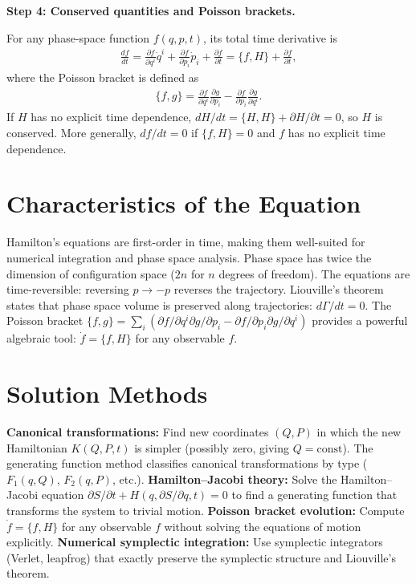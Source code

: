 \textbf{Step 4: Conserved quantities and Poisson brackets.}

For any phase-space function $f(q, p, t)$, its total time derivative is
\begin{align}
\frac{df}{dt} = \frac{\partial f}{\partial q^i}\dot{q}^i + \frac{\partial f}{\partial p_i}\dot{p}_i + \frac{\partial f}{\partial t} = \{f, H\} + \frac{\partial f}{\partial t},
\end{align}
where the Poisson bracket is defined as
\begin{align}
\{f, g\} = \frac{\partial f}{\partial q^i}\frac{\partial g}{\partial p_i} - \frac{\partial f}{\partial p_i}\frac{\partial g}{\partial q^i}.
\end{align}
If $H$ has no explicit time dependence, $dH/dt = \{H, H\} + \partial H/\partial t = 0$, so $H$ is conserved. More generally, $df/dt = 0$ if $\{f, H\} = 0$ and $f$ has no explicit time dependence.

\section*{Characteristics of the Equation}

Hamilton's equations are first-order in time, making them well-suited for numerical integration and phase space analysis. Phase space has twice the dimension of configuration space ($2n$ for $n$ degrees of freedom). The equations are time-reversible: reversing $p \to -p$ reverses the trajectory. Liouville's theorem states that phase space volume is preserved along trajectories: $d\Gamma/dt = 0$. The Poisson bracket $\{f, g\} = \sum_i(\partial f/\partial q^i \partial g/\partial p_i - \partial f/\partial p_i \partial g/\partial q^i)$ provides a powerful algebraic tool: $\dot{f} = \{f, H\}$ for any observable $f$.
\section*{Solution Methods}

\textbf{Canonical transformations:} Find new coordinates $(Q, P)$ in which the new Hamiltonian $K(Q, P, t)$ is simpler (possibly zero, giving $Q = \text{const}$). The generating function method classifies canonical transformations by type ($F_1(q,Q)$, $F_2(q,P)$, etc.). \textbf{Hamilton--Jacobi theory:} Solve the Hamilton--Jacobi equation $\partial S/\partial t + H(q, \partial S/\partial q, t) = 0$ to find a generating function that transforms the system to trivial motion. \textbf{Poisson bracket evolution:} Compute $\dot{f} = \{f, H\}$ for any observable $f$ without solving the equations of motion explicitly. \textbf{Numerical symplectic integration:} Use symplectic integrators (Verlet, leapfrog) that exactly preserve the symplectic structure and Liouville's theorem.
